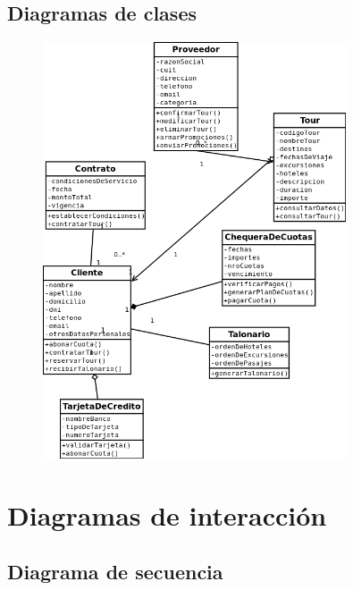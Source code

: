\documentclass[12pt,a4paper,titlepage,oneside]{article}
\begin{document}
\newpage
\subsection{Diagramas de clases}
 
\begin{figure}[htb]
\centerline{\includegraphics[width=0.8\textwidth]{diagramaDeClasesIRTOUR}}
\label{fig:celda}
\end{figure}  


\section{Diagramas de interacción}
\subsection{Diagrama de secuencia} 
 
\end{document}
